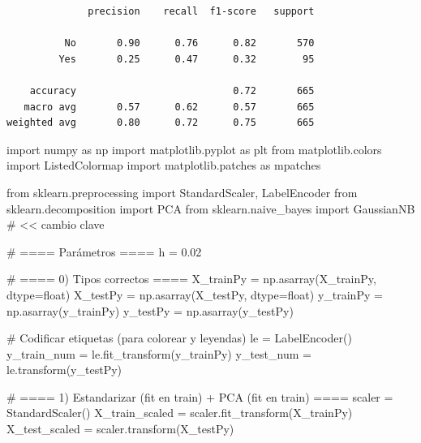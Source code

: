 \documentclass[
  letterpaper,
  DIV=11,
  numbers=noendperiod]{scrartcl}
\newenvironment{Shaded}{\begin{snugshade}}{\end{snugshade}}
\newcommand{\BuiltInTok}[1]{\textcolor[rgb]{0.00,0.23,0.31}{#1}}
\newcommand{\CommentTok}[1]{\textcolor[rgb]{0.37,0.37,0.37}{#1}}
\newcommand{\FloatTok}[1]{\textcolor[rgb]{0.68,0.00,0.00}{#1}}
\newcommand{\ImportTok}[1]{\textcolor[rgb]{0.00,0.46,0.62}{#1}}
\newcommand{\NormalTok}[1]{\textcolor[rgb]{0.00,0.23,0.31}{#1}}
\newcommand{\OperatorTok}[1]{\textcolor[rgb]{0.37,0.37,0.37}{#1}}
\begin{document}
\begin{verbatim}
              precision    recall  f1-score   support

          No       0.90      0.76      0.82       570
         Yes       0.25      0.47      0.32        95

    accuracy                           0.72       665
   macro avg       0.57      0.62      0.57       665
weighted avg       0.80      0.72      0.75       665
\end{verbatim}

\begin{Shaded}
\begin{Highlighting}[]
\ImportTok{import}\NormalTok{ numpy }\ImportTok{as}\NormalTok{ np}
\ImportTok{import}\NormalTok{ matplotlib.pyplot }\ImportTok{as}\NormalTok{ plt}
\ImportTok{from}\NormalTok{ matplotlib.colors }\ImportTok{import}\NormalTok{ ListedColormap}
\ImportTok{import}\NormalTok{ matplotlib.patches }\ImportTok{as}\NormalTok{ mpatches}

\ImportTok{from}\NormalTok{ sklearn.preprocessing }\ImportTok{import}\NormalTok{ StandardScaler, LabelEncoder}
\ImportTok{from}\NormalTok{ sklearn.decomposition }\ImportTok{import}\NormalTok{ PCA}
\ImportTok{from}\NormalTok{ sklearn.naive\_bayes }\ImportTok{import}\NormalTok{ GaussianNB  }\CommentTok{\# \textless{}\textless{} cambio clave}

\CommentTok{\# ==== Parámetros ====}
\NormalTok{h }\OperatorTok{=} \FloatTok{0.02}

\CommentTok{\# ==== 0) Tipos correctos ====}
\NormalTok{X\_trainPy }\OperatorTok{=}\NormalTok{ np.asarray(X\_trainPy, dtype}\OperatorTok{=}\BuiltInTok{float}\NormalTok{)}
\NormalTok{X\_testPy  }\OperatorTok{=}\NormalTok{ np.asarray(X\_testPy,  dtype}\OperatorTok{=}\BuiltInTok{float}\NormalTok{)}
\NormalTok{y\_trainPy }\OperatorTok{=}\NormalTok{ np.asarray(y\_trainPy)}
\NormalTok{y\_testPy  }\OperatorTok{=}\NormalTok{ np.asarray(y\_testPy)}

\CommentTok{\# Codificar etiquetas (para colorear y leyendas)}
\NormalTok{le }\OperatorTok{=}\NormalTok{ LabelEncoder()}
\NormalTok{y\_train\_num }\OperatorTok{=}\NormalTok{ le.fit\_transform(y\_trainPy)}
\NormalTok{y\_test\_num  }\OperatorTok{=}\NormalTok{ le.transform(y\_testPy)}

\CommentTok{\# ==== 1) Estandarizar (fit en train) + PCA (fit en train) ====}
\NormalTok{scaler }\OperatorTok{=}\NormalTok{ StandardScaler()}
\NormalTok{X\_train\_scaled }\OperatorTok{=}\NormalTok{ scaler.fit\_transform(X\_trainPy)}
\NormalTok{X\_test\_scaled  }\OperatorTok{=}\NormalTok{ scaler.transform(X\_testPy)}


\end{Highlighting}
\end{Shaded}
\end{document}
